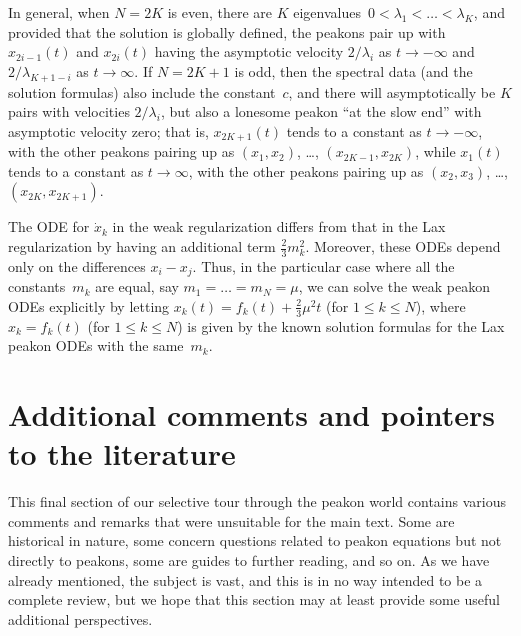 \documentclass[10pt,a4paper]{article} \pdfoutput=1 
\begin{document}
\begin{remark}
  In general, when $N=2K$ is even, there are $K$ eigenvalues~$0<\lambda_1 < \dots < \lambda_K$,
  and provided that the solution is globally defined,
  the peakons pair up with $x_{2i-1}(t)$ and $x_{2i}(t)$ having the asymptotic
  velocity $2/\lambda_i$ as $t \to -\infty$ and $2/\lambda_{K+1-i}$ as $t \to \infty$.
  If $N=2K+1$ is odd, then the spectral data (and the solution formulas)
  also include the constant~$c$,
  and there will asymptotically be $K$ pairs with velocities $2/\lambda_i$,
  but also a lonesome peakon ``at the slow end'' with asymptotic velocity zero;
  that is,
  $x_{2K+1}(t)$ tends to a constant as $t \to -\infty$,
  with the other peakons pairing up as $(x_1,x_2)$, \ldots, $(x_{2K-1},x_{2K})$,
  while $x_1(t)$ tends to a constant as $t \to \infty$,
  with the other peakons pairing up as $(x_2,x_3)$, \ldots, $(x_{2K},x_{2K+1})$.
\end{remark}

\begin{remark}
  The ODE for $\dot x_k$ in the weak regularization
  differs from that in the Lax regularization
  by having an additional term $\frac23 m_k^2$.
  Moreover, these ODEs depend only on the differences $x_i - x_j$.
  Thus, in the particular case where all the constants~$m_k$ are equal,
  say $m_1 = \dots = m_N = \mu$,
  we can solve the weak peakon ODEs explicitly by letting
  $x_k(t) = f_k(t) + \frac23 \mu^2 t$ (for $1 \le k \le N$),
  where
  $x_k = f_k(t)$ (for $1 \le k \le N$)
  is given by the known solution formulas for the Lax peakon ODEs with the same~$m_k$.
\end{remark}








\section{Additional comments and pointers to the literature} \label{sec:guide}

This final section of our selective tour through the peakon world
contains various comments and remarks that were unsuitable for the main text.
Some are historical in nature,
some concern questions related to peakon equations but not directly to peakons,
some are guides to further reading,
and so on.
As we have already mentioned, the subject is vast,
and this is in no way intended to be a complete review,
but we hope that this section may at least provide some useful additional perspectives.
\end{document}
